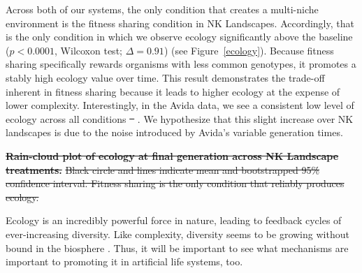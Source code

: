\documentclass[letterpaper]{article}
\providecommand{\DIFaddtex}[1]{{\protect\color{blue}\uwave{#1}}} %
\providecommand{\DIFdeltex}[1]{{\protect\color{red}\sout{#1}}}                      %
\providecommand{\DIFaddbegin}{} %
\providecommand{\DIFaddend}{} %
\providecommand{\DIFdelbegin}{} %
\providecommand{\DIFdelend}{} %
\providecommand{\DIFdelFL}[1]{\DIFdel{#1}} %
\providecommand{\DIFadd}[1]{\texorpdfstring{\DIFaddtex{#1}}{#1}} %
\providecommand{\DIFdel}[1]{\texorpdfstring{\DIFdeltex{#1}}{}} %
\begin{document}
\DIFaddend Across both of our systems, the only condition that creates a multi-niche environment is the fitness sharing condition in NK Landscapes. Accordingly, that is the only condition in which we observe ecology significantly above the baseline ($p<0.0001$, Wilcoxon test; \DIFaddbegin \DIFadd{Glass's }\DIFaddend $\Delta=0.91$) (see Figure~\ref{ecology}). Because fitness sharing specifically rewards organisms with less common genotypes, it promotes a stably high ecology value over time. This result demonstrates the trade-off inherent in fitness sharing because it leads to higher ecology at the expense of lower complexity. Interestingly, in the Avida data, we see a consistent low level of ecology across all conditions \DIFdelbegin \DIFdel{\mbox{%
\citep{emily_dolson_2018_1442906}}\hspace{0pt}%
}\DIFdelend \DIFaddbegin \DIFadd{\mbox{%
\citep{zenodo_dolson_data_2018}}\hspace{0pt}%
}\DIFaddend . We hypothesize that this slight increase over NK landscapes is due to the noise introduced by Avida's variable generation times. 

\DIFdelbegin %
{%
\textbf{\DIFdelFL{Rain-cloud plot of ecology at final generation across NK Landscape treatments.}} %
\DIFdelFL{Black circle and lines indicate mean and bootstrapped 95\% confidence interval. Fitness sharing is the only condition that reliably produces ecology.}}

\DIFdelend Ecology is an incredibly powerful force in nature, leading to feedback cycles of ever-increasing diversity. Like complexity, diversity seems to be growing without bound in the biosphere \citep{harmon_species_2015}. Thus, it will be important to see what mechanisms are important to promoting it in artificial life systems, too.
\end{document}
